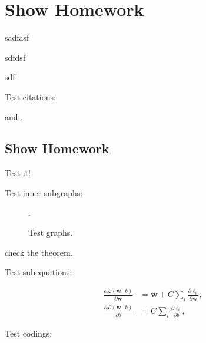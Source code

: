 \documentclass[color,refNum]{ECEHW}
\begin{document}
	
\maketitle

\section{Show Homework}
sadfasf

sdfdsf

sdf

Test citations:

\cite{Zeiler5539957,Yang6175956,Dong7115171} and \cite{Dong7115171}.

\subsection{Show Homework}

\begin{exercise}[Problem 2.1]
	Test it!
    
    Test inner subgraphs:
    
    \begin{figure}[H]
		\centering
		\begin{minipage}[b]{0.48\textwidth}
			\centering
		\end{minipage}
		\begin{minipage}[b]{0.48\textwidth}
			\centering
		\end{minipage}
		\DeclareGraphicsExtensions.
		\caption{Test graphs.}
		\label{fig:ex1:resD}
	\end{figure}

  \begin{theorem}[example]
    \vspace{0.5em}
    check the theorem.
  \end{theorem}

	\qED
	
\end{exercise}

\begin{solution}[proof]
  
Test subequations:

\begin{subequations}
    \renewcommand{\theequation}
    {\theparentequation-\arabic{equation}}
    \begin{align}
    \frac{\partial \mathcal{L}(\mathbf{w},~b)}{\partial \mathbf{w}} &= \mathbf{w} + C \sum\limits_i\frac{\partial \ell_i}{\partial \mathbf{w}}, \label{fml:ex1:partialW}\\
    \frac{\partial \mathcal{L}(\mathbf{w},~b)}{\partial b} &= C \sum\limits_i\frac{\partial \ell_i}{\partial b}, \label{fml:ex1:partialb}
    \end{align}
\end{subequations}
    
Test codings:



\end{solution}



\end{document}
